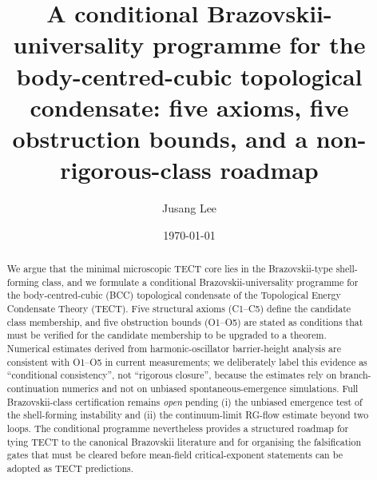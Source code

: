 



\title{A conditional Brazovskii-universality programme for the
body-centred-cubic topological condensate: five axioms, five
obstruction bounds, and a non-rigorous-class roadmap}

\author{Jusang Lee}

\date{\today}

\begin{abstract}
We argue that the minimal microscopic TECT core lies in the
Brazovskii-type shell-forming class, and we formulate a conditional
Brazovskii-universality programme for the body-centred-cubic (BCC)
topological condensate of the Topological Energy Condensate Theory
(TECT). Five structural axioms (C1--C5) define the candidate class
membership, and five obstruction bounds (O1--O5) are stated as
conditions that must be verified for the candidate membership to be
upgraded to a theorem. Numerical estimates derived from
harmonic-oscillator barrier-height analysis are consistent with O1--O5
in current measurements; we deliberately label this evidence as
``conditional consistency'', not ``rigorous closure'', because the
estimates rely on branch-continuation numerics and not on unbiased
spontaneous-emergence simulations. Full Brazovskii-class certification
remains \emph{open} pending (i) the unbiased emergence test of the
shell-forming instability and (ii) the continuum-limit RG-flow
estimate beyond two loops. The conditional programme nevertheless
provides a structured roadmap for tying TECT to the canonical
Brazovskii literature and for organising the falsification gates that
must be cleared before mean-field critical-exponent statements can be
adopted as TECT predictions.
\end{abstract}

